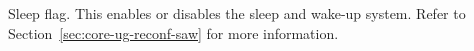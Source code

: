Sleep flag. This enables or disables the sleep and wake-up system. Refer to
Section~\ref{sec:core-ug-reconf-saw} for more information.

\implementation{}
